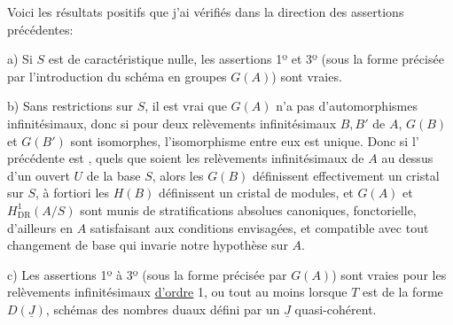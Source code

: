 Voici les résultats positifs que j'ai vérifiés dans la direction des assertions précédentes:

a) Si $S$ est de caractéristique nulle, les assertions 1º et 3º (sous la forme précisée par l'introduction du schéma en groupes $G(A)$) sont vraies.

b) Sans restrictions sur $S$, il est vrai que $G(A)$ n'a pas d'automorphismes infinitésimaux, donc si pour deux relèvements infinitésimaux  $B,B'$ de $A$, $G(B)$ et $G(B')$\deleted{\unsure{,}} sont isomorphes, l'isomorphisme entre eux est unique. Donc si l'  précédente est  , quels que soient les relèvements infinitésimaux de $A$ au dessus d'un ouvert $U$ de la base $S$, alors les $G(B)$ définissent effectivement un cristal  sur $S$, à fortiori les $H(B)$ définissent un cristal de modules, et $G(A)$ et $H^1_{\operatorname{DR}}(A/S)$ sont munis de stratifications absolues canoniques, fonctorielle, d'ailleurs en $A$ satisfaisant aux conditions envisagées, et compatible avec tout changement de base qui invarie notre hypothèse sur $A$.

c) Les assertions 1º à 3º (sous la forme précisée par $G(A)$) sont vraies pour les relèvements infinitésimaux \uline{d'ordre} 1, ou tout au moins lorsque $T$ est de la forme $D(\underline{J})$, schémas des nombres duaux défini par un $\underline{J}$ quasi-cohérent.

